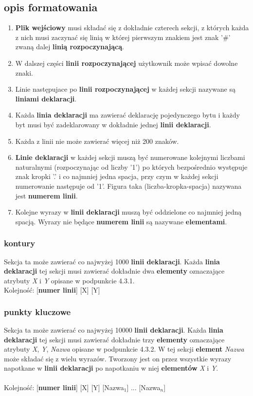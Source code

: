 \documentclass[hidelinks,10pt,a4paper]{article}
\begin{document}
\subsection{opis formatowania}
\begin{enumerate}


\item \textbf{Plik wejściowy} musi składać się z dokładnie czterech sekcji, z których każda z nich musi zaczynać się linią w której pierwszym znakiem jest znak '\#' zwaną dalej \textbf{linią rozpoczynającą}.
\item W dalszej części \textbf{linii rozpoczynającej} użytkownik może wpisać dowolne znaki. 
\item Linie następujace po \textbf{linii rozpoczynającej} w każdej sekcji nazywane są \textbf{liniami deklaracji}.
\item Każda \textbf{linia deklaracji} ma zawierać deklarację pojedynczego bytu i każdy byt musi być zadeklarowany w dokładnie jednej \textbf{linii deklaracji}.
\item Każda z linii nie może zawierać więcej niż 200 znaków.
\item \textbf{Linie deklaracji} w każdej sekcji muszą być numerowane kolejnymi liczbami naturalnymi (rozpoczynając od liczby '1') po których bezpośrednio występuje znak kropki '.' i co najmniej jedna spacja, przy czym w każdej sekcji numerowanie następuje od '1'. Figura taka (liczba-kropka-spacja) nazywana jest \textbf{numerem linii}.
\item Kolejne wyrazy w \textbf{linii deklaracji} muszą być oddzielone co najmniej jedną spacją. Wyrazy nie będące \textbf{numerem linii} są nazywane \textbf{elementami}.
\end{enumerate}
 

\subsubsection{kontury}
Sekcja ta może zawierać co najwyżej 1000 \textbf{linii deklaracji}.
Każda \textbf{linia deklaracji} tej sekcji musi zawierać dokładnie dwa \textbf{elementy} oznaczające atrybuty \textit{X} i \textit{Y} opisane w podpunkcie 4.3.1.
\\ Kolejność: [\textbf{numer linii}] [X] [Y]

\subsubsection{punkty kluczowe}
Sekcja ta może zawierać co najwyżej 10000 \textbf{linii deklaracji}.
Każda \textbf{linia deklaracji} tej sekcji musi zawierać dokładnie trzy \textbf{elementy} oznaczające atrybuty \textit{X}, \textit{Y}, \textit{Nazwa} opisane w podpunkcie 4.3.2. W tej sekcji \textbf{element} \textit{Nazwa} może składać się z wielu wyrazów. Tworzony jest on przez wszystkie wyrazy napotkane w \textbf{linii deklaracji} po napotkaniu w niej \textbf{elementów} \textit{X} i \textit{Y}.
\\
\\ Kolejność: [\textbf{numer linii}] [X] [Y] [Nazwa$_{1}$] ... [Nazwa$_{n}$]
\end{document}
